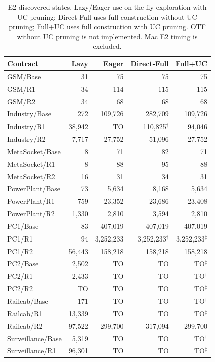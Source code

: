 \begin{table}[t]
\centering\small
\caption{E2 discovered states. Lazy/Eager use on-the-fly exploration with UC pruning; Direct-Full uses full construction without UC pruning; Full+UC uses full construction with UC pruning. OTF without UC pruning is not implemented. Mac E2 timing is excluded.}
\label{tab:abl-e2}
\begin{tabular}{lrrrr}
\toprule
Contract & Lazy & Eager & Direct-Full & Full+UC \\
\midrule
GSM/Base & 31 & 75 & 75 & 75 \\
GSM/R1 & 34 & 114 & 115 & 115 \\
GSM/R2 & 34 & 68 & 68 & 68 \\
Industry/Base & 272 & 109,726 & 282,709 & 109,726 \\
Industry/R1 & 38,942 & TO & 110,825$^{\dagger}$ & 94,046 \\
Industry/R2 & 7,717 & 27,752 & 51,096 & 27,752 \\
MetaSocket/Base & 8 & 71 & 82 & 71 \\
MetaSocket/R1 & 8 & 88 & 95 & 88 \\
MetaSocket/R2 & 16 & 31 & 34 & 31 \\
PowerPlant/Base & 73 & 5,634 & 8,168 & 5,634 \\
PowerPlant/R1 & 759 & 23,352 & 23,686 & 23,408 \\
PowerPlant/R2 & 1,330 & 2,810 & 3,594 & 2,810 \\
PC1/Base & 83 & 407,019 & 407,019 & 407,019 \\
PC1/R1 & 94 & 3,252,233 & 3,252,233$^{\dagger}$ & 3,252,233$^{\ddagger}$ \\
PC1/R2 & 56,443 & 158,218 & 158,218 & 158,218 \\
PC2/Base & 2,502 & TO & TO & TO$^{\ddagger}$ \\
PC2/R1 & 2,433 & TO & TO & TO$^{\ddagger}$ \\
PC2/R2 & TO & TO & TO & TO$^{\ddagger}$ \\
Railcab/Base & 171 & TO & TO & TO$^{\ddagger}$ \\
Railcab/R1 & 13,339 & TO & TO & TO$^{\ddagger}$ \\
Railcab/R2 & 97,522 & 299,700 & 317,094 & 299,700 \\
Surveillance/Base & 5,319 & TO & TO & TO$^{\ddagger}$ \\
Surveillance/R1 & 96,301 & TO & TO & TO$^{\ddagger}$ \\

\end{tabular}
\end{table}
